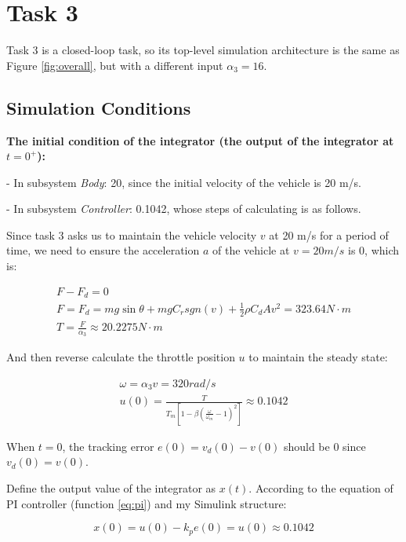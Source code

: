 \documentclass[12pt]{article}
\begin{document}
\section{Task 3}

Task 3 is a closed-loop task, so its top-level simulation architecture is the same as Figure \ref{fig:overall}, but with a different input $\alpha_3 = 16$.

\subsection{Simulation Conditions}

\textbf{The initial condition of the integrator (the output of the integrator at $t=0^+$):}

- In subsystem \textit{Body}: 20, since the initial velocity of the vehicle is 20 m/s.

- In subsystem \textit{Controller}: 0.1042, whose steps of calculating is as follows.

Since task 3 asks us to maintain the vehicle velocity $v$ at 20 m/s for a period of time, we need to ensure the acceleration $a$ of the vehicle at $v=20m/s$ is 0, which is:

\begin{gather}
    F - F_d = 0
    \label{eq:task3_eq_newton} \\
    F = F_d = mg\sin\theta + mgC_rsgn(v) + \frac{1}{2}\rho C_d A v^2 = 323.64 N \cdot m
    \label{eq:task3_eq_friction} \\
    T = \frac{F}{\alpha_3} \approx 20.2275 N \cdot m
    \label{eq:task3_eq_torque}
\end{gather}

And then reverse calculate the throttle position $u$ to maintain the steady state:

\begin{gather}
    \omega = \alpha_3 v = 320 rad/s
    \label{eq:task3_omega} \\
    u(0) = \frac{T}{T_m[1-\beta(\frac{\omega}{\omega_m}-1)^2]} \approx 0.1042
    \label{eq:task3_u}
\end{gather}

When $t=0$, the tracking error $e(0) = v_d(0) - v(0)$ should be 0 since $v_d(0) = v(0)$.

Define the output value of the integrator as $x(t)$. According to the equation of PI controller (function \ref{eq:pi}) and my Simulink structure:

\begin{equation}
    x(0) = u(0) - k_pe(0) = u(0) \approx 0.1042
    \label{eq:task3_x0}
\end{equation}
\end{document}
